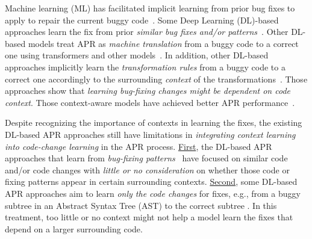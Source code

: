 Machine learning (ML)
has facilitated implicit learning from prior bug fixes to apply to repair
the current buggy
code~\cite{long2016automatic,long2017automatic,saha2017elixir}.
Some Deep Learning (DL)-based approaches learn the fix from prior {\em
  similar bug fixes and/or
  patterns}~\cite{gupta2017deepfix,white2019sorting,white2016deep}.
Other DL-based models treat APR as {\em machine translation} from a
buggy code to a correct one using transformers and other
models~\cite{chakrabortycodit,chen2018sequencer,hata2018learning,tufano2018empirical,see2017get}.
In addition, other DL-based approaches implicitly learn the {\em
  transformation rules} from a buggy code to a correct one accordingly
to the surrounding {\em context} of the
transformations~\cite{chen2018sequencer,icse20,cure-icse21,lutellier2020coconut}.
Those approaches show that {\em learning bug-fixing changes might be
  dependent on {\em code context}}.
Those context-aware models have achieved better APR
performance~\cite{icse20,lutellier2020coconut,cure-icse21}.


Despite recognizing the importance of contexts in learning the fixes,
the existing DL-based APR approaches still have limitations in {\em
  integrating context learning into code-change learning} in the APR
process. \underline{First}, the DL-based APR approaches that learn
from {\em bug-fixing patterns}~\cite{white2016deep,gupta2017deepfix}
have focused on similar code and/or code changes with {\em little or
  no consideration} on whether those code or fixing patterns appear in
certain surrounding contexts. \underline{Second}, some DL-based APR
approaches aim to learn {\em only the code changes} for fixes, e.g.,
from a buggy subtree in an Abstract Syntax Tree (AST)
to the correct subtree
\cite{chakrabortycodit,see2017get}. In this treatment, too
little or no context might not help a model learn the fixes that
depend on a larger surrounding code.

